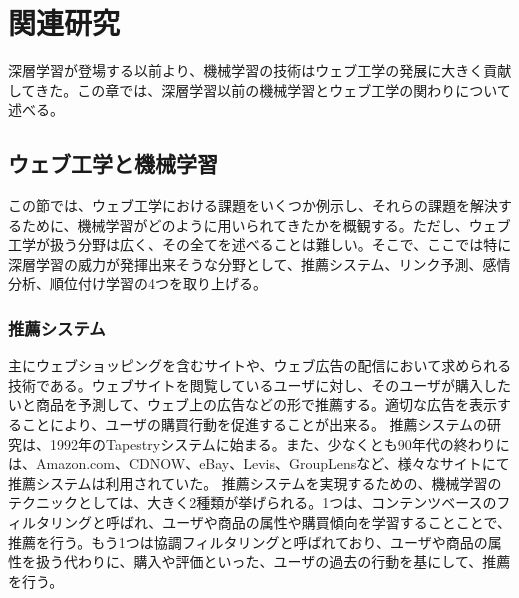 \chapter{関連研究}
深層学習が登場する以前より、機械学習の技術はウェブ工学の発展に大きく貢献してきた。この章では、深層学習以前の機械学習とウェブ工学の関わりについて述べる。

\section{ウェブ工学と機械学習}
この節では、ウェブ工学における課題をいくつか例示し、それらの課題を解決するために、機械学習がどのように用いられてきたかを概観する。ただし、ウェブ工学が扱う分野は広く、その全てを述べることは難しい。そこで、ここでは特に深層学習の威力が発揮出来そうな分野として、推薦システム、リンク予測、感情分析、順位付け学習の4つを取り上げる。

\subsection{推薦システム}
主にウェブショッピングを含むサイトや、ウェブ広告の配信において求められる技術である。ウェブサイトを閲覧しているユーザに対し、そのユーザが購入したいと商品を予測して、ウェブ上の広告などの形で推薦する。適切な広告を表示することにより、ユーザの購買行動を促進することが出来る。
推薦システムの研究は、1992年のTapestryシステムに始まる\cite{goldberg1992using}。また、少なくとも90年代の終わりには、Amazon.com、CDNOW、eBay、Levis、GroupLensなど、様々なサイトにて推薦システムは利用されていた\cite{resnick1997recommender}。
推薦システムを実現するための、機械学習のテクニックとしては、大きく2種類が挙げられる\cite{koren2009matrix}。1つは、コンテンツベースのフィルタリングと呼ばれ、ユーザや商品の属性や購買傾向を学習することことで、推薦を行う。もう1つは協調フィルタリングと呼ばれており、ユーザや商品の属性を扱う代わりに、購入や評価といった、ユーザの過去の行動を基にして、推薦を行う。

